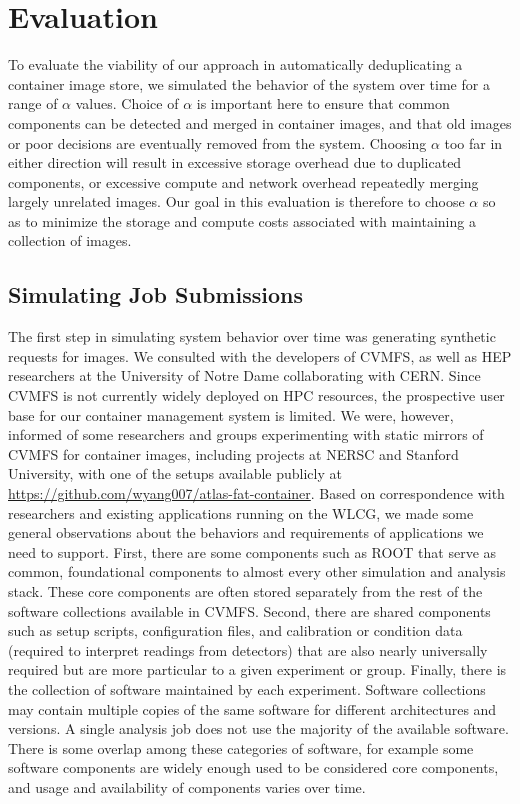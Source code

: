 \documentclass[sigconf]{acmart}
\begin{document}
\section{Evaluation}

To evaluate the viability of our approach in automatically deduplicating a container image store,
we simulated the behavior of the system over time for a range of $\alpha$ values.
Choice of $\alpha$ is important here to ensure that common components can be detected and merged in container images,
and that old images or poor decisions are eventually removed from the system.
Choosing $\alpha$ too far in either direction will result in excessive storage overhead due to duplicated components,
or excessive compute and network overhead repeatedly merging largely unrelated images.
Our goal in this evaluation is therefore to choose $\alpha$ so as to minimize the storage and compute costs associated with maintaining a collection of images.

\subsection{Simulating Job Submissions}

The first step in simulating system behavior over time was generating synthetic requests for images.
We consulted with the developers of CVMFS,
as well as HEP researchers at the University of Notre Dame collaborating with CERN.
Since CVMFS is not currently widely deployed on HPC resources,
the prospective user base for our container management system is limited.
We were, however, informed of some researchers and groups experimenting with static mirrors of CVMFS for container images,
including projects at NERSC and Stanford University,
with one of the setups available publicly at \url{https://github.com/wyang007/atlas-fat-container}.
Based on correspondence with researchers and existing applications running on the WLCG,
we made some general observations about the behaviors and requirements of applications we need to support.
First, there are some components such as ROOT that serve as common, foundational components to almost every other simulation and analysis stack.
These core components are often stored separately from the rest of the software collections available in CVMFS.
Second, there are shared components such as setup scripts, configuration files, and calibration or condition data (required to interpret readings from detectors) that are also nearly universally required but are more particular to a given experiment or group.
Finally, there is the collection of software maintained by each experiment.
Software collections may contain multiple copies of the same software for different architectures and versions.
A single analysis job does not use the majority of the available software.
There is some overlap among these categories of software,
for example some software components are widely enough used to be considered core components,
and usage and availability of components varies over time.
\end{document}

